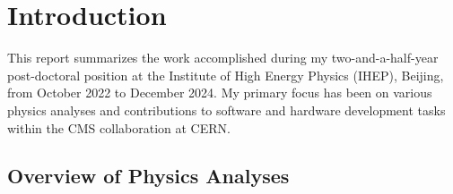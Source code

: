 \chapter{Introduction}
\label{ch:introduction}

This report summarizes the work accomplished during my two-and-a-half-year post-doctoral position
 at the Institute of High Energy Physics (IHEP), Beijing, from October 2022 to December 2024.
 My primary focus has been on various physics analyses and contributions to software and
 hardware development tasks within the CMS collaboration at CERN.

\section*{Overview of Physics Analyses}

